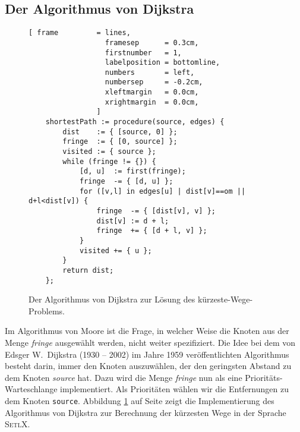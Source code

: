 \subsection{Der Algorithmus von Dijkstra}
\begin{figure}[!ht]
\centering
\begin{Verbatim}[ frame         = lines, 
                  framesep      = 0.3cm, 
                  firstnumber   = 1,
                  labelposition = bottomline,
                  numbers       = left,
                  numbersep     = -0.2cm,
                  xleftmargin   = 0.0cm,
                  xrightmargin  = 0.0cm,
                ]
    shortestPath := procedure(source, edges) {
        dist    := { [source, 0] };
        fringe  := { [0, source] };
        visited := { source };
        while (fringe != {}) {
            [d, u]  := first(fringe);
            fringe  -= { [d, u] };
            for ([v,l] in edges[u] | dist[v]==om || d+l<dist[v]) {
                fringe  -= { [dist[v], v] };
                dist[v] := d + l;
                fringe  += { [d + l, v] };
            }
            visited += { u };
        }
        return dist;
    };
\end{Verbatim}
\vspace*{-0.3cm}
\caption{Der Algorithmus von Dijkstra zur L\"osung des k\"urzeste-Wege-Problems.}
\label{fig:dijkstra.stlx}
\end{figure}

\noindent
Im Algorithmus von Moore ist die Frage, in welcher Weise die Knoten aus der Menge
\textsl{fringe} ausgew\"ahlt werden, nicht weiter spezifiziert.  
Die Idee bei dem von Edsger W.~Dijkstra (1930 -- 2002) im Jahre 1959 ver\"offentlichten
Algorithmus \cite{dijkstra:59}
besteht darin, immer den Knoten auszuw\"ahlen, der den geringsten Abstand zu
dem Knoten \textsl{source} hat.
Dazu wird die Menge \textsl{fringe} nun als  eine Priorit\"ats-Warteschlange
implementiert.  Als Priorit\"aten w\"ahlen wir die Entfernungen zu dem Knoten \texttt{source}.
Abbildung \ref{fig:dijkstra.stlx} auf Seite \pageref{fig:dijkstra.stlx} zeigt die 
Implementierung des Algorithmus von Dijkstra zur Berechnung der k\"urzesten Wege in der Sprache
\textsc{SetlX}.

